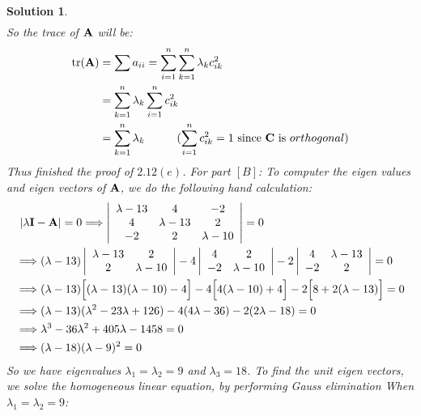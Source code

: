 \documentclass[11pt]{article}\usepackage[]{graphicx}\usepackage[]{color}
\newtheorem{sol}{Solution}
\begin{document}
\begin{sol}
\begin{align*}
	\end{align*}
	So the trace of ${\bf A}$ will be:
	\begin{align*}
		\text{tr}({\bf A}) &= \sum a_{ii} = \sum_{i = 1}^n\sum_{k = 1}^n\lambda_k c_{ik}^2\\
		&= \sum_{k = 1}^n\lambda_k\sum_{i = 1}^n c_{ik}^2\\
		&= \sum_{k = 1}^n \lambda_k \hskip 1cm (\sum_{i = 1}^n c_{ik}^2 = 1 \text{ since } {\bf C} \text{ is } orthogonal)
	\end{align*}
	Thus finished the proof of $2.12(e)$.\vskip 2mm
	For part $[B]$:\vskip 2mm
	To computer the eigen values and eigen vectors of ${\bf A}$, we do the following hand calculation:
	\begin{align*}
		&\ |\lambda {\bf I} - {\bf A}| = 0 \Longrightarrow \left|\begin{array}{ccc} \lambda - 13&4&-2 \\ 4&\lambda-13&2\\-2&2&\lambda - 10  \end{array}\right| = 0\\
		&\Longrightarrow (\lambda - 13)\left|\begin{array}{cc} \lambda - 13& 2\\ 2&\lambda - 10 \end{array}\right| - 4\left|\begin{array}{cc} 4& 2\\ -2& \lambda - 10\end{array}\right| - 2\left|\begin{array}{cc} 4& \lambda - 13\\ -2& 2\end{array}\right| = 0\\
		&\Longrightarrow (\lambda - 13)\Big[(\lambda - 13)(\lambda - 10) - 4\Big] - 4\Big[4(\lambda - 10) + 4\Big] - 2\Big[8 +2(\lambda - 13)\Big] = 0\\
		&\Longrightarrow (\lambda - 13)(\lambda^2 - 23\lambda + 126) - 4(4\lambda - 36) - 2(2\lambda - 18) = 0\\
		&\Longrightarrow \lambda^3 -36\lambda^2 + 405\lambda - 1458 = 0\\
		&\Longrightarrow (\lambda - 18)(\lambda - 9)^2 = 0
	\end{align*}
	So we have eigenvalues $\lambda_1 = \lambda_2 = 9$ and $\lambda_3 = 18$.\vskip 2mm
	To find the unit eigen vectors, we solve the homogeneous linear equation, by performing Gauss elimination\vskip 2mm
	When $\lambda_1 = \lambda_2 = 9$:
	\begin{align*}

\end{align*}
\end{sol}
\end{document}
